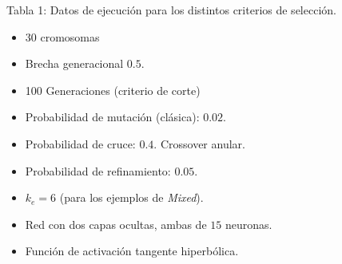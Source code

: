 \documentclass[%
    final,
    reprint,
    notitlepage,
    narroweqnarray,
    inline,
    twoside,
    invited
    ]{ieee}
\begin{document}
\vspace{10px}

\begin{center} 
\par Tabla 1: Datos de ejecución para los distintos criterios de selección.\\
\vspace{5px}
\begin{itemize}
\centering
\item 30 cromosomas
\item Brecha generacional $0.5$.
\item 100 Generaciones (criterio de corte)
\item Probabilidad de mutación (clásica): $0.02$.
\item Probabilidad de cruce: $0.4$. Crossover anular.
\item Probabilidad de refinamiento: $0.05$.
\item $k_e = 6$ (para los ejemplos de \textit{Mixed}).
\item Red con dos capas ocultas, ambas de $15$ neuronas.
\item Función de activación tangente hiperbólica.
\end{itemize}
\end{center}
\end{document}
